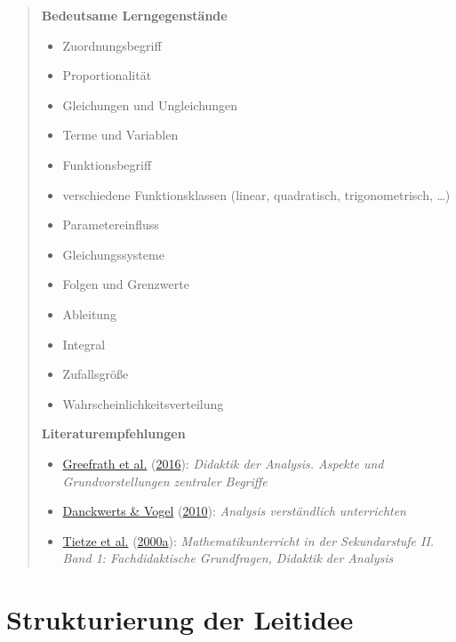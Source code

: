 \documentclass[
  ngerman,
]{scrbook}
\providecommand{\tightlist}{%
  \setlength{\itemsep}{0pt}\setlength{\parskip}{0pt}}
\theoremstyle{definition}
\theoremstyle{definition}
\theoremstyle{definition}
\theoremstyle{definition}
\theoremstyle{remark}
\begin{document}
\begin{quote}
\textbf{Bedeutsame Lerngegenstände}

\begin{itemize}
\tightlist
\item
  Zuordnungsbegriff
\item
  Proportionalität
\item
  Gleichungen und Ungleichungen
\item
  Terme und Variablen
\item
  Funktionsbegriff
\item
  verschiedene Funktionsklassen (linear, quadratisch, trigonometrisch, \ldots)
\item
  Parametereinfluss
\item
  Gleichungssysteme
\item
  Folgen und Grenzwerte
\item
  Ableitung
\item
  Integral
\item
  Zufallsgröße
\item
  Wahrscheinlichkeitsverteilung
\end{itemize}

\textbf{Literaturempfehlungen}

\begin{itemize}
\tightlist
\item
  \protect\hyperlink{ref-Greefrath2016}{Greefrath et al.} (\protect\hyperlink{ref-Greefrath2016}{2016}): \emph{Didaktik der Analysis. Aspekte und Grundvorstellungen zentraler Begriffe}
\item
  \protect\hyperlink{ref-Danckwerts2010}{Danckwerts \& Vogel} (\protect\hyperlink{ref-Danckwerts2010}{2010}): \emph{Analysis verständlich unterrichten}\\
\item
  \protect\hyperlink{ref-Tietze:2000a}{Tietze et al.} (\protect\hyperlink{ref-Tietze:2000a}{2000a}): \emph{Mathematikunterricht in der Sekundarstufe II. Band 1: Fachdidaktische Grundfragen, Didaktik der Analysis}
\end{itemize}
\end{quote}

\hypertarget{strukturierung-der-leitidee-funktionaler-zusammenhang}{%
\section{Strukturierung der Leitidee}\label{strukturierung-der-leitidee-funktionaler-zusammenhang}}
\end{document}
